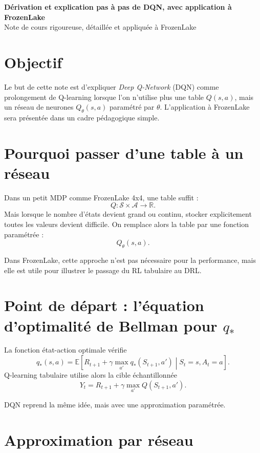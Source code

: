 \documentclass[11pt,a4paper]{article}
\newcommand{\E}{\mathbb{E}}
\newcommand{\R}{\mathbb{R}}
\begin{document}
\begin{center}
    {\LARGE\bfseries Dérivation et explication pas à pas de DQN, avec application à FrozenLake}\\[0.4em]
    {\large Note de cours rigoureuse, détaillée et appliquée à FrozenLake}
\end{center}

\vspace{0.6em}

\section{Objectif}

Le but de cette note est d'expliquer \emph{Deep Q-Network} (DQN) comme prolongement de Q-learning lorsque l'on n'utilise plus une table $Q(s,a)$, mais un réseau de neurones $Q_{\theta}(s,a)$ paramétré par $\theta$. L'application à FrozenLake sera présentée dans un cadre pédagogique simple.

\section{Pourquoi passer d'une table à un réseau}

Dans un petit MDP comme FrozenLake 4x4, une table suffit :
\[
Q:\mathcal S\times\mathcal A\to\R.
\]
Mais lorsque le nombre d'états devient grand ou continu, stocker explicitement toutes les valeurs devient difficile. On remplace alors la table par une fonction paramétrée :
\[
Q_{\theta}(s,a).
\]

Dans FrozenLake, cette approche n'est pas nécessaire pour la performance, mais elle est utile pour illustrer le passage du RL tabulaire au DRL.

\section{Point de départ : l'équation d'optimalité de Bellman pour $q_*$}

La fonction état-action optimale vérifie
\[
q_*(s,a)=\E\!\left[R_{t+1}+\gamma \max_{a'} q_*(S_{t+1},a') \middle\vert S_t=s,A_t=a\right].
\]
Q-learning tabulaire utilise alors la cible échantillonnée
\[
Y_t = R_{t+1}+\gamma \max_{a'}Q(S_{t+1},a').
\]

DQN reprend la même idée, mais avec une approximation paramétrée.

\section{Approximation par réseau}
\end{document}
